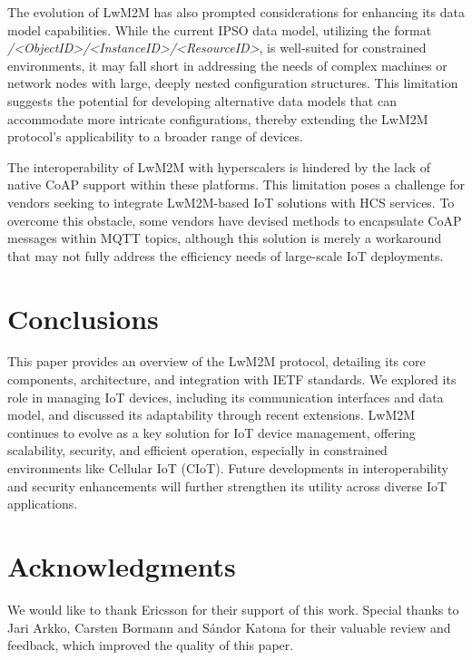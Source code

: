 \documentclass[11pt,sigconf]{iabart}
\begin{document}
The evolution of LwM2M has also prompted considerations for enhancing its data model capabilities. While the current IPSO data model, utilizing the format \textit{/<ObjectID>/<InstanceID>/<ResourceID>}, is well-suited for constrained environments, it may fall short in addressing the needs of complex machines or network nodes with large, deeply nested configuration structures. This limitation suggests the potential for developing alternative data models that can accommodate more intricate configurations, thereby extending the LwM2M protocol's applicability to a broader range of devices.

The interoperability of LwM2M with hyperscalers is hindered by the lack of native CoAP support within these platforms. This limitation poses a challenge for vendors seeking to integrate LwM2M-based IoT solutions with HCS services. To overcome this obstacle, some vendors have devised methods to encapsulate CoAP messages within MQTT topics, although this solution is merely a workaround that may not fully address the efficiency needs of large-scale IoT deployments.

\section{Conclusions} \label{conclusions}

This paper provides an overview of the LwM2M protocol, detailing its core components, architecture, and integration with IETF standards. We explored its role in managing IoT devices, including its communication interfaces and data model, and discussed its adaptability through recent extensions. LwM2M continues to evolve as a key solution for IoT device management, offering scalability, security, and efficient operation, especially in constrained environments like Cellular IoT (CIoT). Future developments in interoperability and security enhancements will further strengthen its utility across diverse IoT applications.

\section{Acknowledgments}

We would like to thank Ericsson for their support of this work. Special thanks to Jari Arkko, Carsten Bormann and Sándor Katona for their valuable review and feedback, which improved the quality of this paper.



\end{document}
